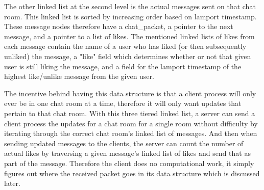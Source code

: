 \documentclass[12pt,journal,compsoc]{IEEEtran}
\begin{document}
The other linked list at the second level is the actual messages sent on that chat room. This linked list is sorted by increasing order based on lamport timestamp. These message nodes therefore have a chat\_packet, a pointer to the next message, and a pointer to a list of likes. The mentioned linked lists of likes from each message contain the name of a user who has liked (or then subsequently unliked) the message, a "like" field which determines whether or not that given user is still liking the message, and a field for the lamport timestamp of the highest like/unlike message from the given user.

The incentive behind having this data structure is that a client process will only ever be in one chat room at a time, therefore it will only want updates that pertain to that chat room. With this three tiered linked list, a server can send a client process the updates for a chat room for a single room without difficulty by iterating through the correct chat room's linked list of messages. And then when sending updated messages to the clients, the server can count the number of actual likes by traversing a given message's linked list of likes and send that as part of the message. Therefore the client does no computational work, it simply figures out where the received packet goes in its data structure which is discussed later.

\newpage
\end{document}
